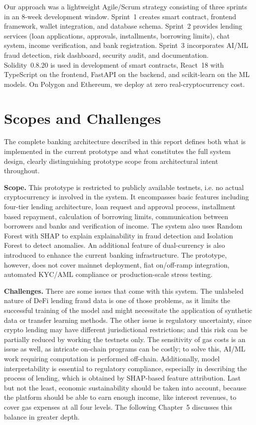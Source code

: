 \documentclass[12pt,a4paper]{report}
\begin{document}
Our approach was a lightweight Agile/Scrum strategy consisting of three sprints in an 8-week development window. Sprint~1 creates smart contract, frontend framework, wallet integration, and database schema. Sprint~2 provides lending services (loan applications, approvals, installments, borrowing limits), chat system, income verification, and bank registration. Sprint~3 incorporates AI/ML fraud detection, risk dashboard, security audit, and documentation. Solidity~0.8.20 is used in development of smart contracts, React~18 with TypeScript on the frontend, FastAPI on the backend, and scikit-learn on the ML models. On Polygon and Ethereum, we deploy at zero real-cryptocurrency cost.

\section{Scopes and Challenges}

\noindent The complete banking architecture described in this report defines both what is implemented in the current prototype and what constitutes the full system design, clearly distinguishing prototype scope from architectural intent throughout.

\textbf{Scope.} This prototype is restricted to publicly available testnets, i.e. no actual cryptocurrency is involved in the system. It encompasses basic features including four-tier lending architecture, loan request and approval process, installment based repayment, calculation of borrowing limits, communication between borrowers and banks and verification of income. The system also uses Random Forest with SHAP to explain explainability in fraud detection and Isolation Forest to detect anomalies. An additional feature of dual-currency is also introduced to enhance the current banking infrastructure. The prototype, however, does not cover mainnet deployment, fiat on/off-ramp integration, automated KYC/AML compliance or production-scale stress testing.

\textbf{Challenges.} There are some issues that come with this system. The unlabeled nature of DeFi lending fraud data is one of those problems, as it limits the successful training of the model and might necessitate the application of synthetic data or transfer learning methods. The other issue is regulatory uncertainty, since crypto lending may have different jurisdictional restrictions; and this risk can be partially reduced by working the testnets only. The sensitivity of gas costs is an issue as well, as intricate on-chain programs can be costly; to solve this, AI/ML work requiring computation is performed off-chain. Additionally, model interpretability is essential to regulatory compliance, especially in describing the process of lending, which is obtained by SHAP-based feature attribution. Last but not the least, economic sustainability should be taken into account, because the platform should be able to earn enough income, like interest revenues, to cover gas expenses at all four levels. The following Chapter~5 discusses this balance in greater depth.
\end{document}
